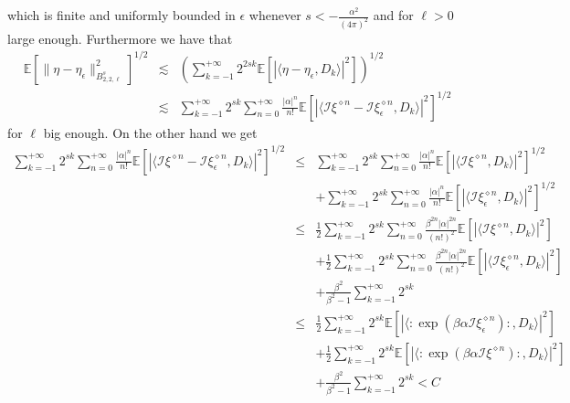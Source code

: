 \documentclass[a4paper,10pt]{article}
\begin{document}
which is finite and uniformly bounded in $\epsilon$ whenever $s < -
\frac{\alpha^2}{(4 \pi)^2}$ and for $\ell > 0$ large enough. Furthermore we
have that
\begin{eqnarray}
  \mathbb{E} [\| \eta - \eta_{\epsilon} \|_{B^s_{2, 2, \ell}}^2]^{1 / 2} &
  \lesssim & \left( \sum_{k = - 1}^{+ \infty} 2^{2 s k} \mathbb{E}[| \langle
  \eta - \eta_{\epsilon}, D_k \rangle |^2] \right)^{1 / 2} \nonumber\\
  & \lesssim & \sum_{k = - 1}^{+ \infty} 2^{s k} \sum^{+ \infty}_{n = 0}
  \frac{| \alpha |^n}{n!} \mathbb{E} [| \langle \mathcal{I} \xi^{\diamond n} -
  \mathcal{I} \xi_{\epsilon}^{\diamond n}, D_k \rangle |^2]^{1 / 2} \nonumber
\end{eqnarray}
for $\ell$ big enough. On the other hand we get
\begin{eqnarray}
  \sum_{k = - 1}^{+ \infty} 2^{s k} \sum^{+ \infty}_{n = 0} \frac{| \alpha
  |^n}{n!} \mathbb{E} [| \langle \mathcal{I} \xi^{\diamond n} - \mathcal{I}
  \xi_{\epsilon}^{\diamond n}, D_k \rangle |^2]^{1 / 2} & \leqslant & \sum_{k
  = - 1}^{+ \infty} 2^{s k} \sum^{+ \infty}_{n = 0} \frac{| \alpha |^n}{n!}
  \mathbb{E} [| \langle \mathcal{I} \xi^{\diamond n}, D_k \rangle |^2]^{1 / 2}
   \nonumber\\
  &  & + \sum_{k = - 1}^{+ \infty} 2^{s k} \sum^{+ \infty}_{n = 0} \frac{|
  \alpha |^n}{n!} \mathbb{E} [| \langle \mathcal{I} \xi_{\epsilon}^{\diamond
  n}, D_k \rangle |^2]^{1 / 2} \nonumber\\
  & \leqslant & \frac{1}{2} \sum_{k = - 1}^{+ \infty} 2^{s k} \sum^{+
  \infty}_{n = 0} \frac{\beta^{2 n} | \alpha |^{2 n}}{(n!)^2} \mathbb{E} [|
  \langle \mathcal{I} \xi^{\diamond n}, D_k \rangle |^2]  \nonumber\\
  &  & + \frac{1}{2} \sum_{k = - 1}^{+ \infty} 2^{s k} \sum^{+ \infty}_{n =
  0} \frac{\beta^{2 n} | \alpha |^{2 n}}{(n!)^2} \mathbb{E} [| \langle
  \mathcal{I} \xi_{\epsilon}^{\diamond n}, D_k \rangle |^2]  \nonumber\\
  &  & + \frac{\beta^2}{\beta^2 - 1} \sum_{k = - 1}^{+ \infty} 2^{s k}
  \nonumber\\
  & \leqslant & \frac{1}{2} \sum_{k = - 1}^{+ \infty} 2^{s k} \mathbb{E} [|
  \langle : \exp (\beta \alpha \mathcal{I} \xi_{\epsilon}^{\diamond n}) :, D_k
  \rangle |^2]  \nonumber\\
  &  & + \frac{1}{2} \sum_{k = - 1}^{+ \infty} 2^{s k} \mathbb{E} [| \langle
  : \exp (\beta \alpha \mathcal{I} \xi^{\diamond n}) :, D_k \rangle |^2] 
  \nonumber\\
  &  & + \frac{\beta^2}{\beta^2 - 1} \sum_{k = - 1}^{+ \infty} 2^{s k} < C
  \nonumber
\end{eqnarray}
\end{document}
